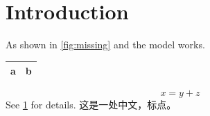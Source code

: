 \documentclass{article}
\begin{document}
\section{Introduction}
As shown in \ref{fig:missing} and \cite{vaswani2017,  he2020} the model works.
\begin{table}
\begin{tabular}{ll}
\hline
a & b \\
\hline
\end{tabular}
\end{table}
\begin{equation}
x = y + z
\end{equation}
See \ref{} for details. 这是一处中文，标点。
\end{document}
